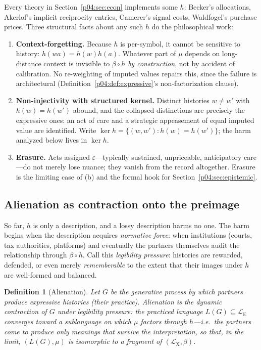 \documentclass[11pt,a4paper]{article}
\newtheorem{definition}{Definition}
\newcommand{\LE}{\mathcal{L}_{\mathrm{E}}}
\newcommand{\LX}{\mathcal{L}_{\mathrm{X}}}
\begin{document}
Every theory in Section~\ref{p04:sec:econ} implements some $h$: Becker's
allocations, Akerlof's implicit reciprocity entries, Camerer's signal costs,
Waldfogel's purchase prices. Three structural facts about any such $h$ do the
philosophical work:

\begin{enumerate}[label=(\alph*)]
\item \textbf{Context-forgetting.} Because $h$ is per-symbol, it cannot be
sensitive to history: $h(wa)=h(w)h(a)$. Whatever part of $\mu$ depends on
long-distance context is invisible to $\beta\circ h$ \emph{by construction},
not by accident of calibration. No re-weighting of imputed values repairs
this, since the failure is architectural (Definition~\ref{p04:def:expressive}'s
non-factorization clause).
\item \textbf{Non-injectivity with structured kernel.} Distinct histories
$w \neq w'$ with $h(w)=h(w')$ abound, and the collapsed distinctions are
precisely the expressive ones: an act of care and a strategic appeasement of
equal imputed value are identified. Write
$\ker h = \{(w,w') : h(w)=h(w')\}$; the harm analyzed below lives in
$\ker h$.
\item \textbf{Erasure.} Acts assigned $\varepsilon$---typically sustained,
unpriceable, anticipatory care---do not merely lose nuance; they vanish from
the record altogether. Erasure is the limiting case of (b) and the formal
hook for Section~\ref{p04:sec:epistemic}.
\end{enumerate}

\subsection{Alienation as contraction onto the preimage}
\label{p04:sec:contraction}
So far, $h$ is only a description, and a lossy description harms no one. The
harm begins when the description acquires \emph{normative force}: when
institutions (courts, tax authorities, platforms) and eventually the partners
themselves audit the relationship through $\beta \circ h$. Call this
\emph{legibility pressure}: histories are rewarded, defended, or even merely
\emph{rememberable} to the extent that their images under $h$ are
well-formed and balanced.

\begin{definition}[Alienation]
\label{p04:def:alienation}
Let $G$ be the generative process by which partners produce expressive
histories (their practice). \emph{Alienation} is the dynamic contraction of
$G$ under legibility pressure: the practiced language
$L(G) \subseteq \LE$ converges toward a sublanguage on which $\mu$ factors
through $h$---i.e.\ the partners come to produce only meanings that survive
the interpretation, so that, in the limit, $(L(G),\mu)$ is isomorphic to a
fragment of $(\LX,\beta)$.
\end{definition}
\end{document}
